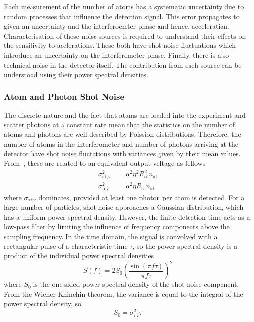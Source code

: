 Each measurement of the number of atoms has a systematic uncertainty due to
random processes that influence the detection signal. This error
propagates to given an uncertainty and the interferoemter phase and
hence, acceleration. Characterisation of these noise sources is
required to understand their effects on the sensitivity to
acclerations.
These both have shot noise fluctuations which introduce an uncertainty
on the interferometer phase. Finally, there is also technical
noise in the detector itself. The contribution from each source can be
understood using their power spectral densities. 
\subsubsection{Atom and Photon Shot Noise}
The discrete nature and the fact that atoms are loaded into the
experiment and scatter photons at a constant rate mean that the
statistics on the number of atoms and photons are well-described by
Poission distributions. Therefore, the number of atoms in the
interferometer and number of photons arriving at the detector have
shot noise fluctations with variances given by their mean values. From~, these are related to an
equivalent output voltage as follows
\begin{align}
  \sigma_\text{at,v}^2 &= \alpha^2 \eta^2 R_\text{sc}^2 n_\text{at}\\
  \sigma_\text{p,v}^2 &= \alpha^2 \eta R_\text{sc} n_\text{at} 
  \label{eq:atom_photon_noise}
\end{align}
where \(\sigma_\text{at,v}\) dominates, provided at least one photon
per atom is detected. For a large number of particles, shot noise
approaches a Gaussian distribution, which has a uniform power spectral
density. However, the finite detection time acts as a low-pass filter by limiting
the influence of frequency components above the sampling frequency.
In the time domain, the signal is convolved with a rectangular pulse
of a characteristic time \(\tau\), so the power spectral density is a
product of the individual power spectral densities
\begin{equation}
  S(f) = 2 S_0\left(\frac{\sin(\pi f \tau)}{\pi f \tau}\right)^2
  \label{eq:psd_shot_conf}
\end{equation}
where \(S_0\) is the one-sided power spectral density of the shot
noise component. From the Wiener-Khinchin theorem, the variance is
equal to the integral of the power spectral density, so
\begin{equation}
  S_0 = \sigma^2_\text{i,v} \tau
  \label{eq:shot_noise_amp}
\end{equation}
